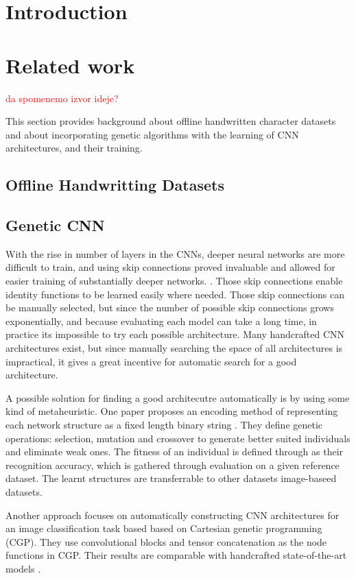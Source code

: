 \documentclass[eng]{simposium}
\begin{document}
\section{Introduction}

\section{Related work}
\textcolor{red}{da spomenemo izvor ideje?}

This section provides background about offline handwritten character datasets and about incorporating genetic algorithms 
with the learning of CNN architectures, and their training. 

\subsection{Offline Handwritting Datasets}

\subsection{Genetic CNN}


With the rise in number of layers in the CNNs, deeper neural networks are more difficult to train, and using skip connections proved invaluable and allowed 
for easier training of substantially deeper networks. \cite{6}. Those skip connections enable identity functions to be learned easily where needed.
Those skip connections can be manually selected, but since the number of possible skip connections grows exponentially, and because evaluating each model can take a long time, 
in practice its impossible to try each possible architecture.
Many handcrafted CNN architectures exist, but since manually searching the space of all architectures is impractical, it gives a great incentive for automatic search 
for a good architecture.

A possible solution for finding a good architecutre automatically is by using some kind of metaheuristic. 
One paper proposes an encoding method of representing each network structure as a fixed length binary string \cite{4}. 
They define genetic operations: selection, mutation and crossover to generate better suited individuals and eliminate weak ones.
The fitness of an individual is defined through as their recognition accuracy, which is gathered through evaluation on a given reference dataset.
The learnt structures are transferrable to other datasets image-baseed datasets.

Another approach focuses on automatically constructing CNN architectures for an image classification task based based on Cartesian genetic programming (CGP).
They use convolutional blocks and tensor concatenation as the node functions in CGP. Their results are comparable with handcrafted state-of-the-art models \cite{5}.
\end{document}
